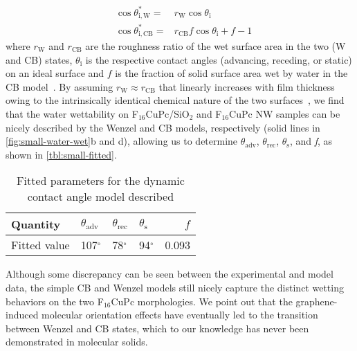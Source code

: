 \begin{eqnarray}
\label{eq:small-2}
&\cos \theta^{*}_{\mathrm{i,W}} =& r_{\mathrm{W}} \cos \theta_{\mathrm{i}} \\
&\cos \theta^{*}_{\mathrm{i,CB}} =& r_{\mathrm{CB}} f \cos \theta_{\mathrm{i}} + f - 1
\end{eqnarray}
where \(r_{\mathrm{W}}\) and \(r_{\mathrm{CB}}\) are the roughness
ratio of the wet surface area in the two (W and CB) states,
\(\theta_{\mathrm{i}}\) is the respective contact angles (advancing,
receding, or static) on an ideal surface and \(f\) is the fraction of
solid surface area wet by water in the CB
model~\cite{Yeh_2008_CBW_hys,McHale_2004,Joanny_1984,Patankar_2010_CBW_hys}.
%
By assuming \(r_{\mathrm{W}} \approx r_{\mathrm{CB}}\) that linearly
increases with film thickness owing to the intrinsically identical
chemical nature of the two surfaces~\cite{Yeh_2008_CBW_hys}, we
find that the water wettability on
F\(_{\text{16}}\)CuPc/SiO\(_{\text{2}}\) and F\(_{\text{16}}\)CuPc NW
samples can be nicely described by the Wenzel and CB models,
respectively (solid lines in \autoref{fig:small-water-wet}b and d), allowing us
to determine \(\theta_{\mathrm{adv}}\), \(\theta_{\mathrm{rec}}\),
\(\theta_{\mathrm{s}}\), and \emph{f}, as shown
in \autoref{tbl:small-fitted}.
%
\begin{table}[!htbp]
\caption{\label{tbl:small-fitted}
Fitted parameters for the dynamic contact angle model described}
\centering
\begin{tabular}{llllr}
\hline
Quantity & \(\theta_{\mathrm{adv}}\) & \(\theta_{\mathrm{rec}}\) & \(\theta_{\mathrm{s}}\) & \(f\) \\
\hline
Fitted value & 107\(^{\circ}\) & 78\(^{\circ}\) & 94\(^{\circ}\) & 0.093 \\
\hline
\end{tabular}
\end{table}
%
Although some discrepancy
can be seen between the experimental and model data, the simple CB
and Wenzel models still nicely capture the distinct wetting behaviors
on the two F\(_{\text{16}}\)CuPc morphologies. We point out that the
graphene-induced molecular orientation effects have eventually led to
the transition between Wenzel and CB states, which to our knowledge
has never been demonstrated in molecular solids.


